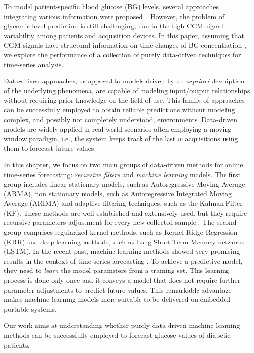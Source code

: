 

To model patient-specific blood glucose (BG) levels, several approaches integrating various information were proposed~\cite{bunescu2013blood, zecchin2011new}. However, the problem of glycemic level prediction is still challenging, due to the high CGM signal variability among patients and acquisition devices.
In this paper, assuming that CGM signals have structural information on time-changes of BG concentration \cite{sparacino2007glucose, bunescu2013blood}, we explore the performance of a collection of purely data-driven techniques for time-series analysis.

Data-driven approaches, as opposed to models driven by an {\em a-priori} description of the underlying phenomena, are capable of modeling input/output relationships without requiring prior knowledge on the field of use. This family of approaches can be successfully employed to obtain reliable predictions without modeling complex, and possibly not completely understood, environments. Data-driven models are widely applied in  real-world scenarios often employing a moving-window paradigm, i.e., the system keeps track of the last $w$ acquisitions using them to forecast future values.

In this chapter, we focus on two main groups of data-driven methods for online time-series forecasting: {\em recursive filters} and {\em machine learning} models.
The first group includes linear stationary models, such as Autoregressive Moving Average (ARMA), non stationary models, such as Autoregressive Integrated Moving Average (ARIMA) and adaptive filtering techniques, such as the Kalman Filter (KF). These methods are well-established and extensively used, but they require recursive parameters adjustment for every new collected sample \cite{box2015time}. 
The second group comprises regularized kernel methods, such as Kernel Ridge Regression (KRR) and deep learning methods, such as Long Short-Term Memory networks (LSTM). In the recent past, machine learning methods showed very promising results in the context of time-series forecasting \cite{bunescu2013blood, schmidhuber2005evolino}. To achieve a predictive model, they need to {\em learn} the model parameters from a training set. This learning process is done only once and it conveys a model that does not require further parameter adjustments to predict future values. This remarkable advantage makes machine learning models more suitable to be delivered on embedded portable systems.

Our work aims at understanding whether purely data-driven machine learning methods can be successfully employed to forecast glucose values of diabetic patients.  


